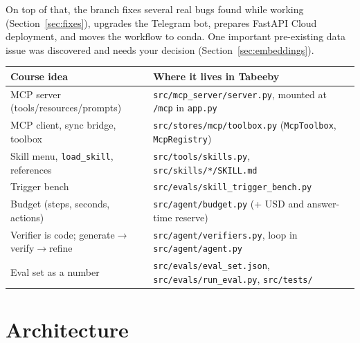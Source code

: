 \documentclass[11pt,a4paper]{article}
\newcommand{\code}[1]{\texttt{#1}}
\begin{document}
On top of that, the branch fixes several real bugs found while working (Section~\ref{sec:fixes}), upgrades the Telegram bot, prepares FastAPI Cloud deployment, and moves the workflow to conda. One important pre-existing data issue was discovered and needs your decision (Section~\ref{sec:embeddings}).

\begin{note}
\small
\begin{tabularx}{\linewidth}{@{}lY@{}}
\toprule
\textbf{Course idea} & \textbf{Where it lives in Tabeeby} \\
\midrule
MCP server (tools/resources/prompts) & \code{src/mcp\_server/server.py}, mounted at \code{/mcp} in \code{app.py} \\
MCP client, sync bridge, toolbox & \code{src/stores/mcp/toolbox.py} (\code{McpToolbox}, \code{McpRegistry}) \\
Skill menu, \code{load\_skill}, references & \code{src/tools/skills.py}, \code{src/skills/*/SKILL.md} \\
Trigger bench & \code{src/evals/skill\_trigger\_bench.py} \\
Budget (steps, seconds, actions) & \code{src/agent/budget.py} (+ USD and answer-time reserve) \\
Verifier is code; generate$\rightarrow$verify$\rightarrow$refine & \code{src/agent/verifiers.py}, loop in \code{src/agent/agent.py} \\
Eval set as a number & \code{src/evals/eval\_set.json}, \code{src/evals/run\_eval.py}, \code{src/tests/} \\
\bottomrule
\end{tabularx}
\end{note}

\section{Architecture}
\end{document}

